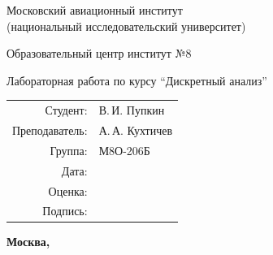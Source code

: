 \begin{titlepage}
\begin{center}
\bfseries

{\Large Московский авиационный институт\\ (национальный исследовательский университет)

}

\vspace{48pt}

{\large Образовательный центр институт №8
}


\vspace{48pt}

Лабораторная работа  по курсу \enquote{Дискретный анализ}

\end{center}

\vspace{72pt}

\begin{flushright}
\begin{tabular}{rl}
Студент: & В.\,И. Пупкин \\
Преподаватель: & А.\,А. Кухтичев \\
Группа: & М8О-206Б \\
Дата: & \\
Оценка: & \\
Подпись: & \\
\end{tabular}
\end{flushright}

\vfill

\begin{center}
\bfseries
Москва, \the\year
\end{center}
\end{titlepage}

\pagebreak